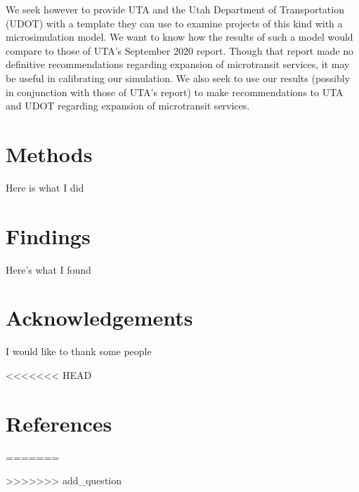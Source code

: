 \documentclass[3p, authoryear]{elsarticle} %
\begin{document}
We seek however to provide UTA and the Utah Department of Transportation (UDOT) with a template they can use to examine projects of this kind with a microsimulation model. We want to know how the results of such a model would compare to those of UTA's September 2020 report. Though that report made no definitive recommendations regarding expansion of microtransit services, it may be useful in calibrating our simulation. We also seek to use our results (possibly in conjunction with those of UTA's report) to make recommendations to UTA and UDOT regarding expansion of microtransit services.

\hypertarget{methods}{%
\section{Methods}\label{methods}}

Here is what I did

\hypertarget{findings}{%
\section{Findings}\label{findings}}

Here's what I found

\hypertarget{acknowledgements}{%
\section*{Acknowledgements}\label{acknowledgements}}

I would like to thank some people

<<<<<<< HEAD
\newpage

\hypertarget{references}{%
\section*{References}\label{references}}


=======

>>>>>>> add_question
\end{document}
